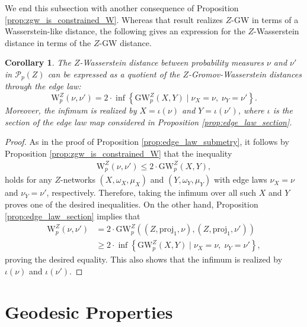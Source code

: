 \documentclass{article}
\newtheorem{corollary}[proposition]{Corollary}
\theoremstyle{definition}
\newcommand{\dgwz}{\mathrm{GW}_p^Z}
\newcommand{\WZ}{\mathcal{P}_p(Z)}
\newcommand{\wz}{\mathrm{W}_p^Z}
\begin{document}
We end this subsection with another consequence of Proposition \ref{prop:zgw_is_constrained_W}. Whereas that result realizes $Z$-GW in terms of a Wasserstein-like distance, the following gives an expression for the $Z$-Wasserstein distance in terms of the $Z$-GW distance.

\begin{corollary}
    \label{cor:zw_is_quotient_gw} The $Z$-Wasserstein distance between probability measures $\nu$ and $\nu'$ in $\WZ$ can be expressed as a quotient of the $Z$-Gromov-Wasserstein distances through the edge law:
    \begin{equation}
        \wz(\nu, \nu') = 2 \cdot \inf\left\{\dgwz(X,Y) \mid \nu_X = \nu, \;\nu_Y = \nu' \right\}.
    \end{equation}
    Moreover, the infimum is realized by $X = \iota(\nu)$ and $Y = \iota(\nu')$, where $\iota$ is the section of the edge law map considered in Proposition \ref{prop:edge_law_section}.
\end{corollary}

\begin{proof}
        As in the proof of Proposition \ref{prop:edge_law_submetry}, it follows by Proposition \ref{prop:zgw_is_constrained_W} that the inequality 
        \begin{align}
            \wz(\nu, \nu') \leq  2 \cdot \dgwz(X, Y),
        \end{align}
        holds for any $Z$-networks $(X,\omega_X, \mu_X)$ and $(Y, \omega_Y, \mu_Y)$ with edge laws $\nu_X = \nu$ and $\nu_Y = \nu'$, respectively. Therefore, taking the infimum over all such $X$ and $Y$ proves one of the desired inequalities. On the other hand, Proposition \ref{prop:edge_law_section} implies that 
        \begin{align}
            \wz(\nu, \nu') &= 2 \cdot \dgwz((Z, \mathrm{proj}_1, \nu), (Z, \mathrm{proj}_1, \nu')) \\
            &\geq 2 \cdot \inf\left\{\dgwz(X,Y) \mid \nu_X = \nu, \;\nu_Y = \nu' \right\},
        \end{align}
        proving the desired equality. This also shows that the infimum is realized by $\iota(\nu)$ and $\iota(\nu')$. 
    \end{proof}


\section{Geodesic Properties}\label{sec:geodesic_properties}
\end{document}
